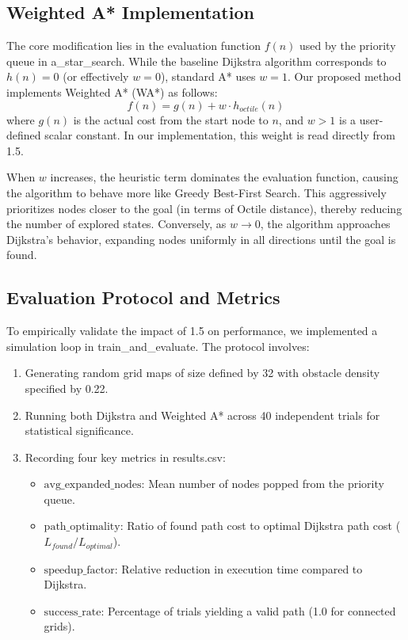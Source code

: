 \documentclass[conference]{IEEEtran}
\renewcommand{\texttt}[1]{{\normalfont\ttfamily #1}}
\begin{document}
\subsection{Weighted A* Implementation}
The core modification lies in the evaluation function $f(n)$ used by the priority queue in a\_star\_search. While the baseline Dijkstra algorithm corresponds to $h(n)=0$ (or effectively $w=0$), standard A* uses $w=1$. Our proposed method implements Weighted A* (WA*) as follows:
\begin{equation}
    f(n) = g(n) + w \cdot h_{octile}(n)
\end{equation}
where $g(n)$ is the actual cost from the start node to $n$, and $w > 1$ is a user-defined scalar constant. In our implementation, this weight is read directly from 1.5. 

When $w$ increases, the heuristic term dominates the evaluation function, causing the algorithm to behave more like Greedy Best-First Search. This aggressively prioritizes nodes closer to the goal (in terms of Octile distance), thereby reducing the number of explored states. Conversely, as $w \to 0$, the algorithm approaches Dijkstra's behavior, expanding nodes uniformly in all directions until the goal is found.

\subsection{Evaluation Protocol and Metrics}
To empirically validate the impact of 1.5 on performance, we implemented a simulation loop in train\_and\_evaluate. The protocol involves:
\begin{enumerate}
    \item Generating random grid maps of size defined by 32 with obstacle density specified by 0.22.
    \item Running both Dijkstra and Weighted A* across 40 independent trials for statistical significance.
    \item Recording four key metrics in \texttt{results.csv}:
    \begin{itemize}
        \item $\text{avg\_expanded\_nodes}$: Mean number of nodes popped from the priority queue.
        \item $\text{path\_optimality}$: Ratio of found path cost to optimal Dijkstra path cost ($L_{found} / L_{optimal}$).
        \item $\text{speedup\_factor}$: Relative reduction in execution time compared to Dijkstra.
        \item $\text{success\_rate}$: Percentage of trials yielding a valid path (1.0 for connected grids).
    \end{itemize}
\end{enumerate}
\end{document}
